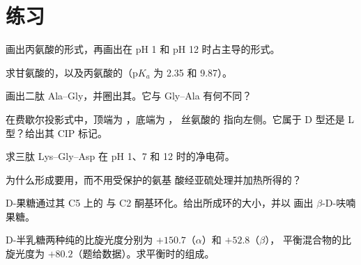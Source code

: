 \section{练习}

\begin{exercise}[$\star$]\label{exo:b2:biomolecules:1}
画出丙氨酸的形式，再画出在 pH 1 和 pH 12 时占主导的形式。
\end{exercise}

\begin{exercise}[$\star$]\label{exo:b2:biomolecules:2}
求甘氨酸的，以及丙氨酸的（$\mathrm pK_a$ 为 2.35 和 9.87）。
\end{exercise}

\begin{exercise}[$\star$]\label{exo:b2:biomolecules:3}
画出二肽 Ala--Gly，并圈出其。它与 Gly--Ala 有何不同？
\end{exercise}

\begin{exercise}[$\star$]\label{exo:b2:biomolecules:4}
在费歇尔投影式中，顶端为 ，底端为 ，
丝氨酸的  指向左侧。它属于 D 型还是 L 型？给出其 CIP 标记。
\end{exercise}

\begin{exercise}[$\star\star$]\label{exo:b2:biomolecules:5}
求三肽 Lys--Gly--Asp 在 pH 1、7 和 12 时的净电荷。
\end{exercise}

\begin{exercise}[$\star\star$]\label{exo:b2:biomolecules:6}
为什么形成要用，而不用受保护的氨基
酸经亚硫处理并加热所得的？
\end{exercise}

\begin{exercise}[$\star\star$]\label{exo:b2:biomolecules:7}
D-果糖通过其 C5 上的  与 C2 酮基环化。给出所成环的大小，并以
画出 $\beta$-D-呋喃果糖。
\end{exercise}

\begin{exercise}[$\star\star$]\label{exo:b2:biomolecules:8}
D-半乳糖两种纯的比旋光度分别为 $+150.7$（$\alpha$）和 $+52.8$（$\beta$），
平衡混合物的比旋光度为 $+80.2$（题给数据）。求平衡时的组成。
\end{exercise}

